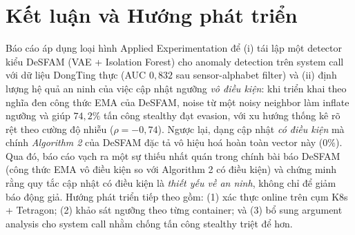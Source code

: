 \section{Kết luận và Hướng phát triển}\label{sec:concl}
Báo cáo áp dụng loại hình Applied Experimentation để (i) tái lập một detector kiểu DeSFAM (VAE + Isolation Forest) cho anomaly detection trên system call với dữ liệu DongTing thực (AUC $0{,}832$ sau sensor-alphabet filter) và (ii) định lượng hệ quả an ninh của việc cập nhật ngưỡng \textit{vô điều kiện}: khi triển khai theo nghĩa đen công thức EMA của DeSFAM, noise từ một noisy neighbor làm inflate ngưỡng và giúp $74{,}2\%$ tấn công stealthy đạt evasion, với xu hướng thống kê rõ rệt theo cường độ nhiễu ($\rho=-0{,}74$). Ngược lại, dạng cập nhật \textit{có điều kiện} mà chính \textit{Algorithm 2} của DeSFAM đặc tả vô hiệu hoá hoàn toàn vector này ($0\%$). Qua đó, báo cáo vạch ra một sự thiếu nhất quán trong chính bài báo DeSFAM (công thức EMA vô điều kiện so với Algorithm 2 có điều kiện) và chứng minh rằng quy tắc cập nhật có điều kiện là \textit{thiết yếu về an ninh}, không chỉ để giảm báo động giả. Hướng phát triển tiếp theo gồm: (1) xác thực online trên cụm K8s + Tetragon; (2) khảo sát ngưỡng theo từng container; và (3) bổ sung argument analysis cho system call nhằm chống tấn công stealthy triệt để hơn.
